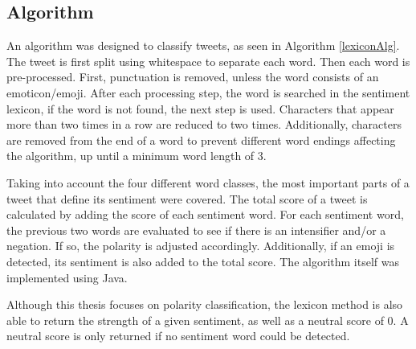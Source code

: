 \subsection{Algorithm}

An algorithm was designed to classify tweets, as seen in Algorithm \ref{lexiconAlg}. The tweet is first split using whitespace to separate each word. Then each word is pre-processed. First, punctuation is removed, unless the word consists of an emoticon/emoji. After each processing step, the word is searched in the sentiment lexicon, if the word is not found, the next step is used. Characters that appear more than two times in a row are reduced to two times. Additionally, characters are removed from the end of a word to prevent different word endings affecting the algorithm, up until a minimum word length of 3.

Taking into account the four different word classes, the most important parts of a tweet that define its sentiment were covered. The total score of a tweet is calculated by adding the score of each sentiment word. For each sentiment word, the previous two words are evaluated to see if there is an intensifier and/or a negation. If so, the polarity is adjusted accordingly. Additionally, if an emoji is detected, its sentiment is also added to the total score. The algorithm itself was implemented using Java.

Although this thesis focuses on polarity classification, the lexicon method is also able to return the strength of a given sentiment, as well as a neutral score of 0. A neutral score is only returned if no sentiment word could be detected.


